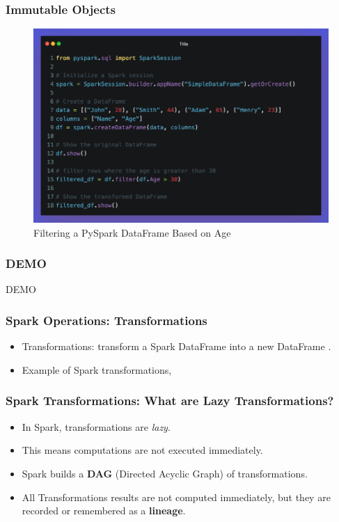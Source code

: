 \begin{frame}[fragile]
    \frametitle{Immutable Objects}
    \begin{figure}
        \includegraphics[width=\textwidth,height=.75\textheight,keepaspectratio]{./Figures/chapter-04/pyspark_immutable_df}
        \caption{Filtering a PySpark DataFrame Based on Age}\label{fig:pyspark_immutable_df}
    \end{figure}
\end{frame}
\begin{frame}[fragile]
    \frametitle{DEMO}
    DEMO
\end{frame}
\begin{frame}
    \frametitle{Spark Operations: Transformations}
    \begin{itemize}
        \item Transformations: transform a Spark DataFrame into a new DataFrame \textit{\color{blue}{without altering the original data}}.
        \item Example of Spark transformations, \texttt{\color{orange}{map(), select(), filter(), or drop()} }
    \end{itemize}
\end{frame}

\begin{frame}
    \frametitle{Spark Transformations: What are Lazy Transformations?}
    \begin{itemize}
        \item In Spark, transformations are \textit{lazy}.
        \item This means computations are not executed immediately.
        \item Spark builds a \textbf{DAG} (Directed Acyclic Graph) of transformations.
        \item All Transformations results are not computed immediately, but they are recorded or remembered as a \textbf{lineage}.
    \end{itemize}
\end{frame}

